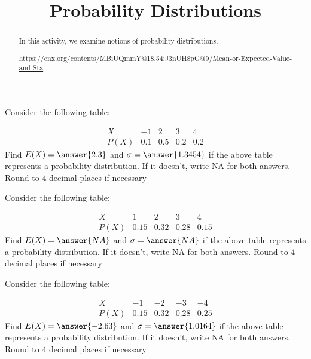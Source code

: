 \documentclass{ximera}
\title{Probability Distributions}
\begin{document}
      
\begin{abstract}
      
In this activity, we examine notions of probability distributions.

\url{https://cnx.org/contents/MBiUQmmY@18.54:J3nUH8pG@9/Mean-or-Expected-Value-and-Sta}

      
\end{abstract}
      
\maketitle
 

\begin{problem}
Consider the following table:

$$
\begin{array}{c|cccc}
X&-1&2&3&4\\
\hline
P(X)&0.1&0.5 &0.2&0.2
\end{array}
$$
Find $E(X)=\answer{2.3}$ and $\sigma=\answer{1.3454}$ if the above table represents a probability distribution.  If it doesn't, write NA for both answers.  Round to 4 decimal places if necessary

\end{problem}



\begin{problem}
Consider the following table:

$$
\begin{array}{c|cccc}
X&1&2&3&4\\
\hline
P(X)&0.15&0.32 &0.28&0.15
\end{array}
$$
Find $E(X)=\answer{NA}$ and $\sigma=\answer{NA}$ if the above table represents a probability distribution.  If it doesn't, write NA for both answers.  Round to 4 decimal places if necessary

\end{problem}

\begin{problem}
Consider the following table:

$$
\begin{array}{c|cccc}
X&-1&-2&-3&-4\\
\hline
P(X)&0.15&0.32 &0.28&0.25
\end{array}
$$
Find $E(X)=\answer{-2.63}$ and $\sigma=\answer{1.0164}$ if the above table represents a probability distribution.  If it doesn't, write NA for both answers.  Round to 4 decimal places if necessary

\end{problem}
\end{document}
